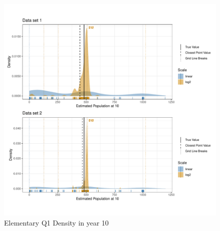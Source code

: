 \documentclass[print]{nuthesis}
\begin{document}
\begin{figure}[tbp]

{\centering \includegraphics[width=1\linewidth,]{thesis_files/figure-latex/qe1-density-plot-10-all-1} 

}

\caption{Elementary Q1 Density in year 10}\label{fig:qe1-density-plot-10-all}
\end{figure}
\end{document}
